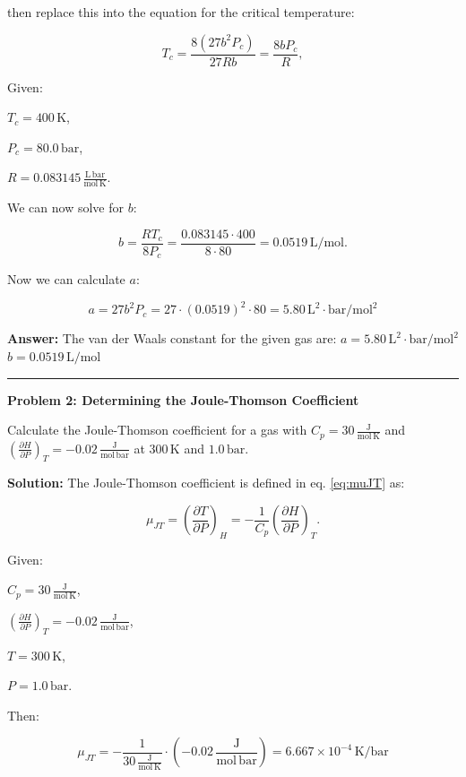 \documentclass[
  9pt,
]{extbook}
\theoremstyle{definition}
\theoremstyle{definition}
\theoremstyle{definition}
\theoremstyle{definition}
\theoremstyle{remark}
\begin{document}
then replace this into the equation for the critical temperature:

\[T_c = \frac{8(27b^2P_c)}{27Rb} = \frac{8bP_c}{R},\]

Given:

\(T_c = 400\,\text{K}\),

\(P_c = 80.0\,\text{bar}\),

\(R = 0.083145\,\frac{\text{L}\,\text{bar}}{\text{mol}\,\text{K}}\).

We can now solve for \(b\):

\[b = \frac{RT_c}{8P_c} = \frac{0.083145 \cdot 400}{8 \cdot 80} = 0.0519\,\text{L}/\text{mol}.\]

Now we can calculate \(a\):

\[a = 27b^2P_c = 27 \cdot (0.0519)^2 \cdot 80 = 5.80\,\text{L}^2\cdot\text{bar}/\text{mol}^2\]

\textbf{Answer:} The van der Waals constant for the given gas are:
\(a = 5.80\,\text{L}^2\cdot\text{bar}/\text{mol}^2\)
\(b = 0.0519\,\text{L}/\text{mol}\)

\begin{center}\rule{0.5\linewidth}{0.5pt}\end{center}

\textbf{Problem 2: Determining the Joule-Thomson Coefficient}

Calculate the Joule-Thomson coefficient for a gas with \(C_p = 30\,\frac{\text{J}}{\text{mol}\,\text{K}}\) and \(\left(\frac{\partial H}{\partial P}\right)_T = -0.02\,\frac{\text{J}}{\text{mol}\,\text{bar}}\) at \(300\,\text{K}\) and \(1.0\,\text{bar}\).

\textbf{Solution:} The Joule-Thomson coefficient is defined in eq. \eqref{eq:muJT} as:

\[\mu_{JT} = \left(\frac{\partial T}{\partial P}\right)_H = -\frac{1}{C_p}\left(\frac{\partial H}{\partial P}\right)_T.\]

Given:

\(C_p = 30\,\frac{\text{J}}{\text{mol}\,\text{K}}\),

\(\left(\frac{\partial H}{\partial P}\right)_T = -0.02\,\frac{\text{J}}{\text{mol}\,\text{bar}}\),

\(T = 300\,\text{K}\),

\(P = 1.0\,\text{bar}\).

Then:

\[\mu_{JT} = -\frac{1}{30\,\frac{\text{J}}{\text{mol}\,\text{K}}} \cdot \left(-0.02\,\frac{\text{J}}{\text{mol}\,\text{bar}}\right) = 6.667 \times 10^{-4}\,\text{K}/\text{bar}\]
\end{document}
